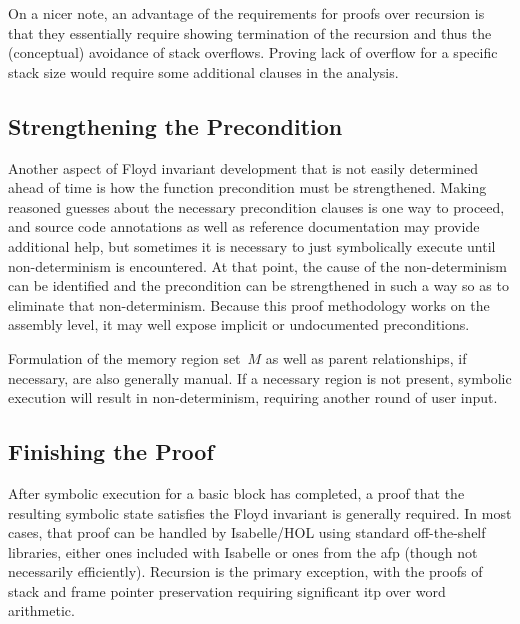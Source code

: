 On a nicer note, an advantage of the requirements for proofs over recursion
is that they essentially require showing termination of the recursion
and thus the (conceptual) avoidance of stack overflows.
Proving lack of overflow for a specific stack size
would require some additional clauses in the analysis.

\subsection{Strengthening the Precondition}
Another aspect of Floyd invariant development
that is not easily determined ahead of time is how the function precondition
must be strengthened.%
Making reasoned guesses about the necessary precondition clauses is one way to proceed,
and source code annotations as well as reference documentation
may provide additional help, but sometimes it is necessary to just symbolically execute
until non-determinism is encountered.
At that point, the cause of the non-determinism can be identified
and the precondition can be strengthened in such a way so as to eliminate%
that non-determinism.
Because this proof methodology works on the assembly level,
it may well expose implicit or undocumented preconditions.

Formulation of the memory region set~$M$ as well as parent relationships,
if necessary, are also generally manual.
If a necessary region is not present,
symbolic execution will result in non-determinism,
requiring another round of user input.

\subsection{Finishing the Proof}
After symbolic execution for a basic block has completed,
a proof that the resulting symbolic state satisfies the Floyd invariant
is generally required.
In most cases, that proof can be handled by Isabelle/HOL
using standard off-the-shelf libraries,
either ones included with Isabelle or ones from the \ac{afp}
(though not necessarily efficiently).
Recursion is the primary exception,
with the proofs of stack and frame pointer preservation
requiring significant \ac{itp} over word arithmetic.

